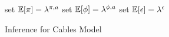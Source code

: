 \begin{algorithm}
  


set $\mathbb{E}[\pi] = \lambda^{\pi,a}$ \;
set $\mathbb{E}[\phi] = \lambda^{\phi,a}$ \;
set $\mathbb{E}[\epsilon] = \lambda^{\epsilon}$ \;
\BlankLine
\Return{$\E[\pi]$, $\E[\phi]$, $\E[\epsilon]$} \;
\caption{Inference for Cables Model}
\label{alg:cables}
\end{algorithm}